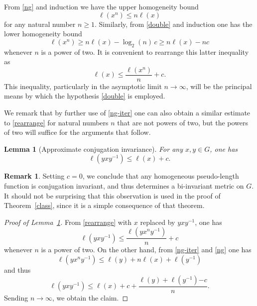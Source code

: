 \documentclass[11pt,a4paper,reqno]{amsart}
\numberwithin{equation}{section}
\theoremstyle{plain}
\newtheorem{lemma}[equation]{Lemma}
\theoremstyle{definition}
\newtheorem{remark}[equation]{Remark}
\newcommand\normsymb{\ell}  %
\newcommand\norm[1]{\ell({#1})}   %
\begin{document}
From \eqref{ng} and induction we have the upper homogeneity
bound
\begin{equation}\label{ng-iter}
 \norm{x^n} \leq { n \norm{x}}
\end{equation}
for any natural number $n \geq 1$.  Similarly, from \eqref{double} and
induction one has the lower homogeneity bound
\[
\norm{x^n} \geq { n \norm{x} - \log_2(n)\, c \geq n \norm{x} - n c}
\]
whenever $n$ is a power of two.  It is convenient to rearrange this
latter inequality as
\begin{equation}\label{rearrange}
\norm{x} \leq \frac{\norm{x^n}}{n}  + { c}.
\end{equation}
This inequality, particularly in the asymptotic limit $n \to \infty$,
will be the principal means by which the hypothesis \eqref{double} is
employed.

We remark that by further use of \eqref{ng-iter} one can also obtain a
similar estimate to \eqref{rearrange} for natural numbers $n$ that are
not powers of two, but the powers of two will suffice for the
arguments that follow.

\begin{lemma}[Approximate conjugation invariance]\label{aci}
For any $x,y \in G$, one has
\[
\norm{yxy^{-1} } \leq { \norm{ x } + c}.
\]
\end{lemma}


\begin{remark}\label{Rinv}
Setting { $c=0$}, we conclude that any homogeneous
pseudo-length function is conjugation invariant, and thus determines a
bi-invariant metric on $G$. It should not be surprising that this
observation is used in the proof of Theorem~\ref{class}, since it is a
simple consequence of that theorem.
\end{remark}

\begin{proof}[Proof of Lemma~\ref{aci}]
From \eqref{rearrange} with $x$ replaced by $yxy^{-1}$, one has
\[
\norm{yxy^{-1}} \leq \frac{\norm{y x^n y^{-1}} }{n} + { c}
\]
whenever $n$ is a power of two.  On the other hand, from \eqref{ng-iter}
and \eqref{ng} one has
\[
\norm{ y x^n y^{-1} } \leq \norm{y} + n \norm{x} + \norm{y^{-1}}
\]
and thus
\[
\norm{yxy^{-1}} \leq \norm{x} + { c} + \frac{\norm{y} +
\norm{y^{-1}} { - c}}{n}.
\]
Sending $n \to \infty$, we obtain the claim.
\end{proof}
\end{document}
